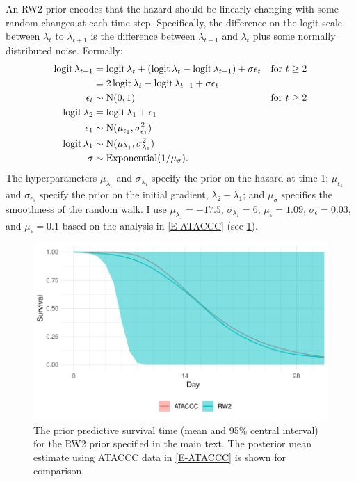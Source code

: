 \documentclass[thesis.tex]{subfiles}
\begin{document}
An RW2 prior encodes that the hazard should be linearly changing with some random changes at each time step.
Specifically, the difference on the logit scale between $\lambda_t$ to $\lambda_{t+1}$ is the difference between $\lambda_{t-1}$ and $\lambda_t$ plus some normally distributed noise.
Formally:
\begin{align}
  \operatorname{logit}\lambda_{t+1}
  &= \operatorname{logit}\lambda_t + (\operatorname{logit}\lambda_t - \operatorname{logit}\lambda_{t-1}) + \sigma \epsilon_t &\text{for $t \geq 2$} \\
  &= 2\operatorname{logit}\lambda_t - \operatorname{logit}\lambda_{t-1} + \sigma \epsilon_t \\
  \epsilon_t &\sim \operatorname{N}(0, 1) &\text{for $t \geq 2$}  \\
  \operatorname{logit}\lambda_2 &= \operatorname{logit}\lambda_1 + \epsilon_1 \\\
  \epsilon_1 &\sim \operatorname{N}(\mu_{\epsilon_1}, \sigma_{\epsilon_1}^2) \\
  \operatorname{logit} \lambda_1 &\sim \operatorname{N}(\mu_{\lambda_1}, \sigma_{\lambda_1}^2) \\
  \sigma &\sim \operatorname{Exponential}(1/\mu_\sigma).
\end{align}
The hyperparameters $\mu_{\lambda_1}$ and $\sigma_{\lambda_1}$ specify the prior on the hazard at time 1; $\mu_{\epsilon_1}$ and $\sigma_{\epsilon_1}$ specify the prior on the initial gradient, $\lambda_2 - \lambda_1$; and $\mu_\sigma$ specifies the smoothness of the random walk.
I use $\mu_{\lambda_1} = -17.5$, $\sigma_{\lambda_1} = 6$, $\mu_\epsilon = 1.09$, $\sigma_\epsilon = 0.03$, and $\mu_\epsilon = 0.1$ based on the analysis in \cref{E-ATACCC} (see \cref{perf-test:fig:rw2-prior}).
\begin{figure}
  \centering \includegraphics{cis-perfect-testing/rw2-prior}
  \caption[RW2 prior for the hazard]{The prior predictive survival time (mean and 95\% central interval) for the RW2 prior specified in the main text. The posterior mean estimate using ATACCC data in \cref{E-ATACCC} is shown for comparison. \label{perf-test:fig:rw2-prior}}
\end{figure}
\end{document}
